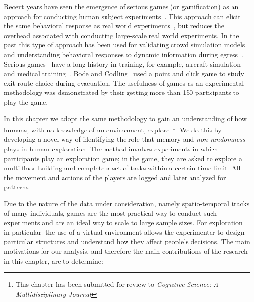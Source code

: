 Recent years have seen the emergence of serious games (or gamification) as an approach for conducting human subject experiments~\cite{Anonymous:2011ba,Aydt:2011wz,Michael:2005:SGG:1051239,Waller:2002we}. This approach can elicit the same behavioral response as real world experiments~\cite{O'Neill1992319}, but reduces the overhead associated with conducting large-scale real world experiments. In the past this type of approach has been used for validating crowd simulation models~\cite{npelechano:2008ug, Anonymous:2011ba, Viswanathan2014} and understanding behavioral responses to dynamic information during egress~\cite{Bode06022014,Viswanathan:ut}. Serious games~\cite{Michael:2005:SGG:1051239} have a long history in training, for example, aircraft simulation~\cite{hays1992flight} and medical training~\cite{jama.282.9.861}.
Bode and Codling~\cite{Bode2013347} used a point and click game to study exit route choice during evacuation. The usefulness of games as an experimental methodology was demonstrated by their getting more than 150 participants to play the game.

In this chapter we adopt the same methodology to gain an understanding of how humans, with no knowledge of an environment, explore~\footnote{This chapter has been submitted for review to \emph{Cognitive Science: A Multidisciplinary Journal}}. We do this by developing a novel way of identifying the role that memory and {\em non-randomness} plays in human exploration. The method involves experiments in which participants play an exploration game; in the game, they are asked to explore a multi-floor building and complete a set of tasks within a certain time limit. All the movement and actions of the players are logged and later analyzed for patterns.

Due to the nature of the data under consideration, namely spatio-temporal tracks of many individuals, games are the most practical way to conduct such experiments and are an ideal way to scale to large sample sizes. For exploration in particular, the use of a virtual environment allows the experimenter to design particular structures and understand how they affect people's decisions. The main motivations for our analysis, and therefore the main contributions of the research in this chapter, are to determine:

